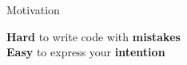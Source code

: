 \begin{frame}{Motivation}%
	\Large%
	\raggedright\textbf{Hard} to write code with \textbf{mistakes}\\[1.5cm]
	\pause%
	\raggedleft\textbf{Easy} to express your \textbf{intention}\\[1.5cm]
	\pause%
	\centering{}%
\end{frame}%
